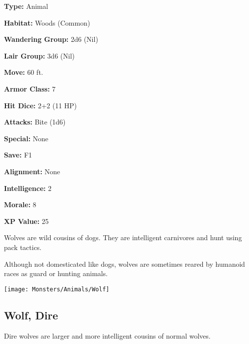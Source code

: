\begin{multicols*}{2}
{\textbf{Type:} Animal

\textbf{Habitat:} Woods (Common)

\textbf{Wandering Group:} 2d6 (Nil)

\textbf{Lair Group:} 3d6 (Nil)

\textbf{Move:} 60 ft.

\textbf{Armor Class:} 7

\textbf{Hit Dice:} 2+2 (11 HP)

\textbf{Attacks:} Bite (1d6)

\textbf{Special:} None

\textbf{Save:} F1

\textbf{Alignment:} None

\textbf{Intelligence:} 2

\textbf{Morale:} 8

\textbf{XP Value:} 25}

Wolves are wild cousins of dogs. They are intelligent carnivores and hunt using pack tactics.

Although not domesticated like dogs, wolves are sometimes reared by humanoid races as guard or hunting animals.

\texttt{[image: Monsters/Animals/Wolf]}

\subsection{Wolf, Dire}\label{monster:Dire Wolf}

Dire wolves are larger and more intelligent cousins of normal wolves.


\end{multicols*}
